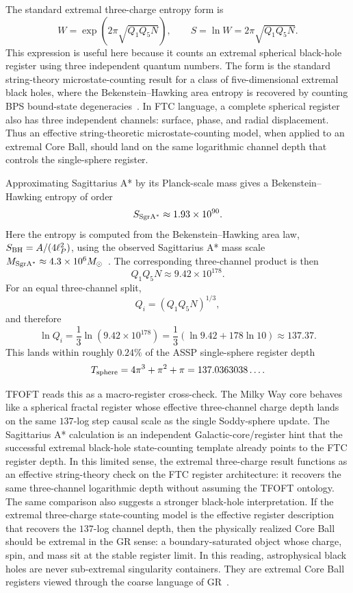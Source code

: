 \documentclass[11pt,a4paper]{article}
\begin{document}
    The standard extremal three-charge entropy form is
    \[
    W=\exp\left(2\pi\sqrt{Q_1Q_5N}\right),
    \qquad
    S=\ln W=2\pi\sqrt{Q_1Q_5N}.
    \]
    This expression is useful here because it counts an extremal spherical black-hole register using three independent quantum numbers. The form is the standard string-theory microstate-counting result for a class of five-dimensional extremal black holes, where the Bekenstein--Hawking area entropy is recovered by counting BPS bound-state degeneracies~\cite{StromingerVafa1996,CallanMaldacena1996}. In FTC language, a complete spherical register also has three independent channels: surface, phase, and radial displacement. Thus an effective string-theoretic microstate-counting model, when applied to an extremal Core Ball, should land on the same logarithmic channel depth that controls the single-sphere register.

    Approximating Sagittarius A* by its Planck-scale mass gives a Bekenstein--Hawking entropy of order
    \[
    S_{\rm SgrA^*}\approx1.93\times10^{90}.
    \]
    Here the entropy is computed from the Bekenstein--Hawking area law, \(S_{\rm BH}=A/(4\ell_P^2)\), using the observed Sagittarius A* mass scale \(M_{\rm SgrA^*}\approx4.3\times10^6M_\odot\)~\cite{Bekenstein1973,Hawking1975,GRAVITY2022SgrA}. The corresponding three-channel product is then
    \[
    Q_1Q_5N\approx9.42\times10^{178}.
    \]
    For an equal three-channel split,
    \[
    Q_i=(Q_1Q_5N)^{1/3},
    \]
    and therefore
    \[
    \ln Q_i
    =
    \frac13\ln\left(9.42\times10^{178}\right)
    =
    \frac13\left(\ln 9.42+178\ln 10\right)
    \approx
    137.37.
    \]
    This lands within roughly \(0.24\%\) of the ASSP single-sphere register depth
    \[
    T_{\rm sphere}
    =
    4\pi^3+\pi^2+\pi
    =
    137.0363038\ldots .
    \]

    TFOFT reads this as a macro-register cross-check. The Milky Way core behaves like a spherical fractal register whose effective three-channel charge depth lands on the same \(137\)-log step causal scale as the single Soddy-sphere update. The Sagittarius A* calculation is an independent Galactic-core/register hint that the successful extremal black-hole state-counting template already points to the FTC register depth. In this limited sense, the extremal three-charge result functions as an effective string-theory check on the FTC register architecture: it recovers the same three-channel logarithmic depth without assuming the TFOFT ontology.
    The same comparison also suggests a stronger black-hole interpretation. If the extremal three-charge state-counting model is the effective register description that recovers the \(137\)-log channel depth, then the physically realized Core Ball should be extremal in the GR sense: a boundary-saturated object whose charge, spin, and mass sit at the stable register limit. In this reading, astrophysical black holes are never sub-extremal singularity containers. They are extremal Core Ball registers viewed through the coarse language of GR~\cite{StromingerVafa1996,CallanMaldacena1996,BardeenHorowitz1999,KunduriLucietti2013}.
\end{document}
